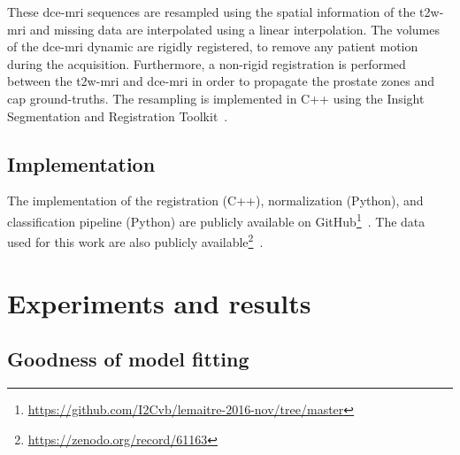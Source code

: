 These \ac{dce}-\ac{mri} sequences are resampled using the spatial information of the \ac{t2w}-\ac{mri} and missing data are interpolated using a linear interpolation.
The volumes of the \ac{dce}-\ac{mri} dynamic are rigidly registered, to remove any patient motion during the acquisition.
Furthermore, a non-rigid registration is performed between the \ac{t2w}-\ac{mri} and \ac{dce}-\ac{mri} in order to propagate the prostate zones and \ac{cap} ground-truths.
The resampling is implemented in C++ using the Insight Segmentation and Registration Toolkit~\citep{ibanez2005itk}.

\subsection{Implementation}

The implementation of the registration (C++), normalization (Python), and classification pipeline (Python) are publicly available on GitHub\footnote{\url{https://github.com/I2Cvb/lemaitre-2016-nov/tree/master}}~\citep{lemaitre2016github}.
The data used for this work are also publicly available\footnote{\url{https://zenodo.org/record/61163}}~\citep{lemaitre2016dce}.

\section{Experiments and results}\label{sec:experiments}

\subsection{Goodness of model fitting}\label{sec:fit}


\begin{table}
  \caption{Coefficient of determination $R^{2}$ (i.e., $\mu \ (\pm \sigma)$), while fitting data with the different quantification models.}
  \centering
  \label{tab:r2}
\end{table}

